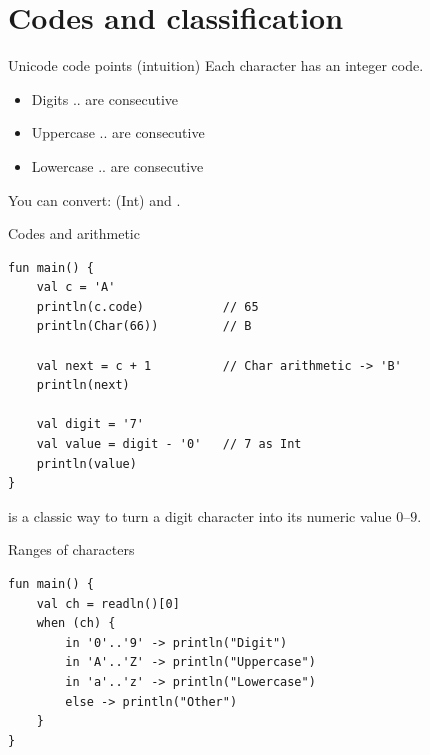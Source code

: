 \documentclass[aspectratio=169,11pt]{beamer}
\begin{document}
    \section{Codes and classification}

    \begin{frame}{Unicode code points (intuition)}
        Each character has an integer code.
        \vspace{0.5em}
        \begin{itemize}
            \item Digits .. are consecutive
            \item Uppercase .. are consecutive
            \item Lowercase .. are consecutive
        \end{itemize}
        \vspace{0.4em}
        You can convert:  (Int) and .
    \end{frame}

    \begin{frame}[fragile]{Codes and arithmetic}
        \begin{lstlisting}
fun main() {
    val c = 'A'
    println(c.code)           // 65
    println(Char(66))         // B

    val next = c + 1          // Char arithmetic -> 'B'
    println(next)

    val digit = '7'
    val value = digit - '0'   // 7 as Int
    println(value)
}
        \end{lstlisting}
         is a classic way to turn a digit character into its
        numeric value $0$--$9$.
    \end{frame}

    \begin{frame}[fragile]{Ranges of characters}
        \begin{lstlisting}
fun main() {
    val ch = readln()[0]
    when (ch) {
        in '0'..'9' -> println("Digit")
        in 'A'..'Z' -> println("Uppercase")
        in 'a'..'z' -> println("Lowercase")
        else -> println("Other")
    }
}
        \end{lstlisting}
    \end{frame}
\end{document}
